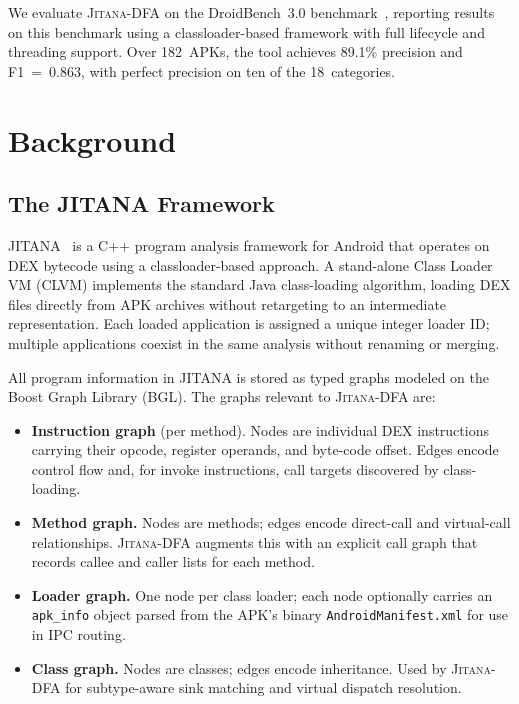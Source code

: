 \documentclass[conference]{IEEEtran}
\begin{document}
We evaluate \textsc{Jitana-DFA} on the DroidBench~3.0 benchmark~\cite{droidbench}, reporting
results on this benchmark using a classloader-based framework with full lifecycle
and threading support. Over 182~APKs, the tool achieves 89.1\% precision and
F1~=~0.863, with perfect precision on ten of the 18~categories.

\section{Background}

\subsection{The JITANA Framework}

JITANA~\cite{jitana} is a C++ program analysis framework for Android that
operates on DEX bytecode using a classloader-based approach. A stand-alone Class
Loader VM (CLVM) implements the standard Java class-loading algorithm, loading
DEX files directly from APK archives without retargeting to an intermediate
representation. Each loaded application is assigned a unique integer loader ID;
multiple applications coexist in the same analysis without renaming or merging.

All program information in JITANA is stored as typed graphs modeled on the Boost
Graph Library (BGL). The graphs relevant to \textsc{Jitana-DFA} are:

\begin{itemize}

\item \textbf{Instruction graph} (per method). Nodes are individual DEX
instructions carrying their opcode, register operands, and byte-code offset.
Edges encode control flow and, for invoke instructions, call targets discovered
by class-loading.

\item \textbf{Method graph.} Nodes are methods; edges encode direct-call and
virtual-call relationships. \textsc{Jitana-DFA} augments this with an explicit
call graph that records callee and caller lists for each method.

\item \textbf{Loader graph.} One node per class loader; each node optionally
carries an \texttt{apk\_info} object parsed from the APK's binary
\texttt{AndroidManifest.xml} for use in IPC routing.

\item \textbf{Class graph.} Nodes are classes; edges encode inheritance. Used
by \textsc{Jitana-DFA} for subtype-aware sink matching and virtual dispatch
resolution.

\end{itemize}
\end{document}
